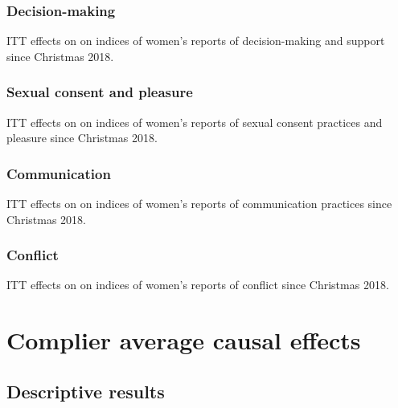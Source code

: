 \documentclass[11pt,english]{article}
\begin{document}
\subsubsection{Decision-making}

\begin{table}[H]
\centering

\caption{ITT effects on on indices of women's reports of decision-making and support since Christmas 2018.}
\label{tab:dm_etc_results_w}
\end{table}

\subsubsection{Sexual consent and pleasure}

\begin{table}[H]
\centering

\caption{ITT effects on on indices of women's reports of sexual consent practices and pleasure since Christmas 2018.}
\label{tab:sex_results_w}
\end{table}

\subsubsection{Communication}

\begin{table}[H]
\centering

\caption{ITT effects on on indices of women's reports of communication practices since Christmas 2018.}
\label{tab:comm_results_w}
\end{table}

\subsubsection{Conflict}

\begin{table}[H]
\centering

\caption{ITT effects on on indices of women's reports of conflict since Christmas 2018.}
\label{tab:conflict_results_w}
\end{table}

\section{Complier average causal effects}

\subsection{Descriptive results}
\end{document}
